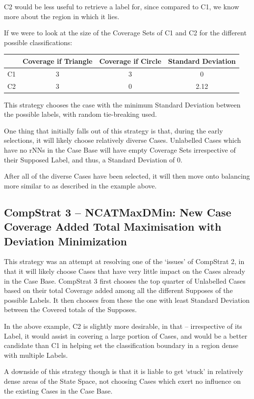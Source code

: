 \documentclass[a4paper,11pt]{report}
\begin{document}
C2 would be less useful to retrieve a label for, since compared to C1, we know more about the region in which it lies.

If we were to look at the size of the Coverage Sets of C1 and C2 for the different possible classifications:

\begin{tabular}{|c|c|c|c|}
\cline{2-4} 
\multicolumn{1}{c|}{} & Coverage if Triangle & Coverage if Circle & Standard Deviation\tabularnewline
\hline 
C1 & 3 & 3 & 0\tabularnewline
\hline 
C2 & 3 & 0 & 2.12\tabularnewline
\hline 
\end{tabular}

\vspace{10pt}

This strategy chooses the case with the minimum Standard Deviation between the possible labels, with random tie-breaking used.

One thing that initially falls out of this strategy is that, during the early selections, it will likely choose relatively diverse Cases. Unlabelled Cases which have no rNNs in the Case Base will have empty Coverage Sets irrespective of their Supposed Label, and thus, a Standard Deviation of 0.

After all of the diverse Cases have been selected, it will then move onto balancing more similar to as described in the example above.

\subsection{CompStrat 3 – NCATMaxDMin: New Case Coverage Added Total Maximisation with Deviation Minimization}
This strategy was an attempt at resolving one of the `issues' of CompStrat 2, in that it will likely choose Cases that have very little impact on the Cases already in the Case Base.  CompStrat 3 first chooses the top quarter of Unlabelled Cases based on their total Coverage added among all the different Supposes of the possible Labels. It then chooses from these the one with least Standard Deviation between the Covered totals of the Supposes.

In the above example, C2 is slightly more desirable, in that – irrespective of its Label, it would assist in covering a large portion of Cases, and would be a better candidate than C1 in helping set the classification boundary in a region dense with multiple Labels.

A downside of this strategy though is that it is liable to get `stuck' in relatively dense areas of the State Space, not choosing Cases which exert no influence on the existing Cases in the Case Base.
\end{document}
